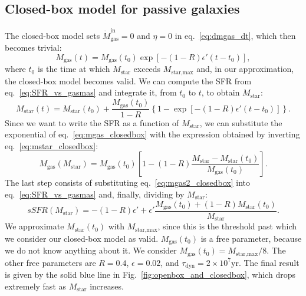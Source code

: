 \documentclass[fleqn,usenatbib]{mnras}
\begin{document}
\subsection{Closed-box model for passive galaxies}\label{sec:closed_box}
The closed-box model sets $\dot{M}_\text{gas}^\text{in}=0$ and $\eta=0$ in eq.~\ref{eq:dmgas_dt}, which then becomes trivial:
\begin{equation}
    M_\text{gas}(t) = M_\text{gas}(t_0)\exp{[-(1-R)\epsilon' (t-t_0)]},
	\label{eq:mgas_closedbox}
\end{equation}
where $t_0$ is the time at which $M_{\text{star}}$ exceeds $M_\text{star,max}$ and, in our approximation, the closed-box model becomes valid. We can compute the SFR from eq.~\ref{eq:SFR_vs_gasmas} and integrate it, from $t_0$ to $t$, to obtain $M_{\text{star}}$:
{\fontsize{8.3pt}{8.3pt}\begin{equation}
    M_\text{star}(t) = M_\text{star}(t_0) + \dfrac{M_\text{gas}(t_0)}{1-R}\left\{1-\exp\left[-(1-R)\epsilon' (t-t_0)\right]\right\}.
	\label{eq:mstar_closedbox}
\end{equation}}
Since we want to write the SFR as a function of $M_{\text{star}}$, we can substitute the exponential of eq.~\ref{eq:mgas_closedbox} with the expression obtained by inverting eq.~\ref{eq:mstar_closedbox}:
\begin{equation}
    M_\text{gas}\left(M_\text{star}\right) = M_\text{gas}(t_0)\left[1 - (1-R)\dfrac{M_\text{star} - M_\text{star}(t_0)}{M_\text{gas}(t_0)}\right].
	\label{eq:mgas2_closedbox}
\end{equation}
The last step consists of substituting eq.~\ref{eq:mgas2_closedbox} into eq.~\ref{eq:SFR_vs_gasmas} and, finally, dividing by $M_{\text{star}}$:
\begin{equation}
    sSFR\left(M_\text{star}\right) = -(1-R)\epsilon' + \epsilon' \dfrac{M_\text{gas}(t_0) + (1-R)M_\text{star}(t_0)}{M_\text{star}}.
	\label{eq:sSFR_closedbox}
\end{equation}
We approximate $M_\text{star}(t_0)$ with $M_\text{star,max}$, since this is the threshold past which we consider our closed-box model as valid. $M_\text{gas}(t_0)$ is a free parameter, because we do not know anything about it. We consider $M_\text{gas}(t_0) = M_\text{star,max}/8$. The other free parameters are $R=0.4$, $\epsilon=0.02$, and $\tau_\text{dyn}=2 \times 10^7 \text{yr}$. The final result is given by the solid blue line in Fig.~\ref{fig:openbox_and_closedbox}, which drops extremely fast as $M_\text{star}$ increases.
\end{document}
